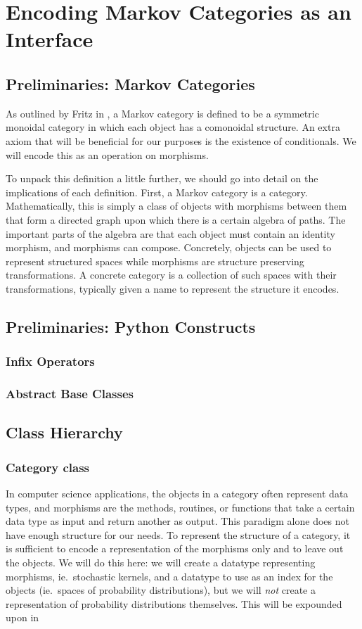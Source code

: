 \section{Encoding Markov Categories as an Interface}
\subsection{Preliminaries: Markov Categories}
As outlined by Fritz in \cite{fritz}, a Markov category is defined to be a symmetric monoidal category in which each object has a comonoidal structure.
An extra axiom that will be beneficial for our purposes is the existence of conditionals.
We will encode this as an operation on morphisms.

To unpack this definition a little further, we should go into detail on the implications of each definition.
First, a Markov category is a category.
Mathematically, this is simply a class of objects with morphisms between them that form a directed graph upon which there is a certain algebra of paths.
The important parts of the algebra are that each object must contain an identity morphism, and morphisms can compose.
Concretely, objects can be used to represent structured spaces while morphisms are structure preserving transformations.
A concrete category is a collection of such spaces with their transformations, typically given a name to represent the structure it encodes.

\subsection{Preliminaries: Python Constructs}
\subsubsection{Infix Operators}
\subsubsection{Abstract Base Classes}

\subsection{Class Hierarchy}
\subsubsection{Category class}
In computer science applications, the objects in a category often represent data types, and morphisms are the methods, routines, or functions that take a certain data type as input and return another as output.
This paradigm alone does not have enough structure for our needs.
To represent the structure of a category, it is sufficient to encode a representation of the morphisms only and to leave out the objects.
We will do this here: we will create a datatype representing morphisms, ie.\ stochastic kernels, and a datatype to use as an index for the objects (ie.\ spaces of probability distributions), but we will \emph{not} create a representation of probability distributions themselves.
This will be expounded upon in 

